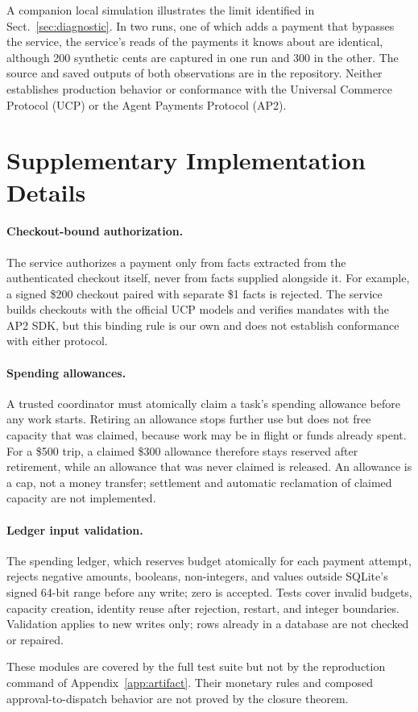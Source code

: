\documentclass[runningheads]{llncs}
\begin{document}
A companion local simulation illustrates the limit identified in
Sect.~\ref{sec:diagnostic}. In two runs, one of which adds a payment that
bypasses the service, the service's reads of the payments it knows about are
identical, although 200 synthetic cents are captured in one run and 300 in the
other. The source and saved outputs of both observations are in the
repository. Neither establishes production behavior or conformance with the
Universal Commerce Protocol (UCP) or the Agent Payments Protocol
(AP2).

\section{Supplementary Implementation Details}
\label{app:implementation}
\paragraph{Checkout-bound authorization.}
The service authorizes a payment only from facts extracted from the
authenticated checkout itself, never from facts supplied alongside it. For
example, a signed \$200 checkout paired with separate \$1 facts is rejected.
The service builds checkouts with the official UCP models and verifies
mandates with the AP2 SDK, but this binding rule is our own and does not
establish conformance with either protocol.

\paragraph{Spending allowances.}
A trusted coordinator must atomically claim a task's spending allowance
before any work starts. Retiring an allowance stops further use but does not
free capacity that was claimed, because work may be in flight or funds already
spent. For a \$500 trip, a claimed \$300 allowance therefore stays reserved
after retirement, while an allowance that was never claimed is released. An allowance is a cap, not a money transfer; settlement and
automatic reclamation of claimed capacity are not implemented.

\paragraph{Ledger input validation.}
The spending ledger, which reserves budget atomically for each payment
attempt, rejects negative amounts, booleans, non-integers, and values
outside SQLite's signed 64-bit range before any write; zero is accepted. Tests
cover invalid budgets, capacity creation, identity reuse after rejection,
restart, and integer boundaries. Validation applies to new writes only; rows
already in a database are not checked or repaired.

These modules are covered by the full test suite but not by the
reproduction command of Appendix~\ref{app:artifact}.
Their monetary rules and composed approval-to-dispatch behavior are not proved
by the closure theorem.
\end{document}
